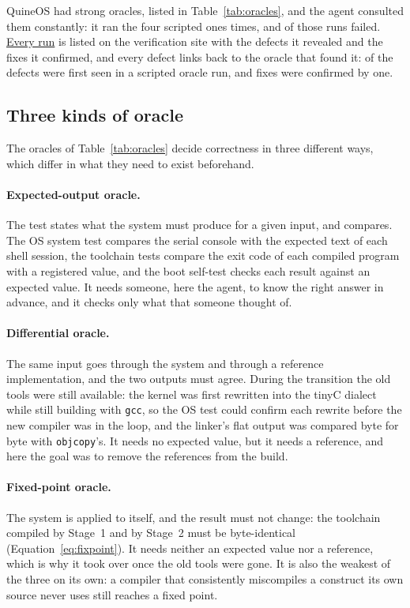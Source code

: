 \documentclass{article}
\newcommand{\sysname}{QuineOS}
\begin{document}
\sysname{} had strong oracles, listed in
Table~\ref{tab:oracles}, and the agent consulted them constantly: it ran the four
scripted ones \noraclesruns{} times, and \noraclesfailed{} of those runs failed. 
\href{\siteurl/oracles.html}{Every run} is listed on the verification site with the
defects it revealed and the fixes it confirmed, and every defect links back to the oracle
that found it: \ntfirstinrun{} of the \ntdefects{} defects were first seen in a scripted
oracle run, and \ntconfirmedinrun{} fixes were confirmed by one.

\subsection{Three kinds of oracle}\label{sec:oraclekinds}

The oracles of Table~\ref{tab:oracles} decide correctness in three different ways, which
differ in what they need to exist beforehand.

\paragraph{Expected-output oracle.} The test states what the system must produce for a
given input, and compares. The OS system test compares the serial console with the
expected text of each shell session, the toolchain tests compare the exit code of each
compiled program with a registered value, and the boot self-test checks each result
against an expected value. It needs someone, here the agent, to know the right answer in
advance, and it checks only what that someone thought of.

\paragraph{Differential oracle.} The same input goes through the system and through a
reference implementation, and the two outputs must agree. During the transition the
old tools were still available: the kernel was first rewritten into the tinyC dialect
while still building with \texttt{gcc}, so the OS test could confirm each rewrite before
the new compiler was in the loop, and the linker's flat output was compared byte for
byte with \texttt{objcopy}'s. It needs no expected value, but it needs a reference, and
here the goal was to remove the references from the build.

\paragraph{Fixed-point oracle.} The system is applied to itself, and the result must not
change: the toolchain compiled by Stage~1 and by Stage~2 must be byte-identical
(Equation~\eqref{eq:fixpoint}). It needs neither an expected value nor a reference, which
is why it took over once the old tools were gone. It is also the weakest of the three on
its own: a compiler that consistently miscompiles a construct its own source never uses
still reaches a fixed point.
\end{document}

